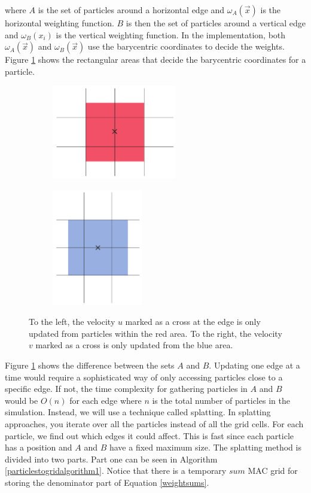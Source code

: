 where $A$ is the set of particles around a horizontal edge and $\omega_A(\vec{x})$ is the horizontal weighting function. $B$ is then the set of particles around a vertical edge and $\omega_B(x_i)$ is the vertical weighting function. In the implementation, both $\omega_A(\vec{x})$ and $\omega_B(\vec{x})$ use the barycentric coordinates to decide the weights. Figure \ref{areaa} shows the rectangular areas that decide the barycentric coordinates for a particle.
\begin{figure}[ht!]
\centering
\begin{subfigure}[b]{0.5\textwidth}
\includegraphics[height=41mm]{img/areau.pdf}
\end{subfigure}
\begin{subfigure}[b]{0.3\textwidth}
\includegraphics[height=51mm]{img/areav.pdf}
\end{subfigure}
\caption{To the left, the velocity $u$ marked as a cross at the edge is only updated from particles within the red area. To the right, the velocity $v$ marked as a cross is only updated from the blue area.}
\label{areaa}
\end{figure}
\newline
\newline
\noindent
Figure \ref{areaa} shows the difference between the sets $A$ and $B$. Updating one edge at a time would require a sophisticated way of only accessing particles close to a specific edge. If not, the time complexity for gathering particles in $A$ and $B$ would be $O(n)$ for each edge where $n$ is the total number of particles in the simulation. Instead, we will use a technique called splatting. In splatting approaches, you iterate over all the particles instead of all the grid cells. For each particle, we find out which edges it could affect. This is fast since each particle has a position and $A$ and $B$ have a fixed maximum size. The splatting method is divided into two parts. Part one can be seen in Algorithm \ref{particlestogridalgorithm1}. Notice that there is a temporary $sum$ MAC grid for storing the denominator part of Equation \ref{weightsums}.
